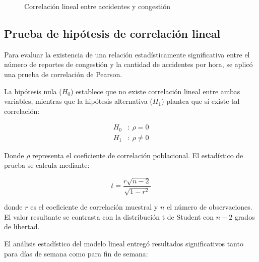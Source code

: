 \documentclass[12pt]{article}
\begin{document}
\begin{figure}[H]
    \centering
    \newline
    \newline
    \caption{Correlación lineal entre accidentes y congestión}
    \label{fig:corr_lineal}
\end{figure}

\subsection{Prueba de hipótesis de correlación lineal}

Para evaluar la existencia de una relación estadísticamente significativa entre el número de reportes de congestión y la cantidad de accidentes por hora, se aplicó una prueba de correlación de Pearson.

La hipótesis nula ($H_0$) establece que no existe correlación lineal entre ambas variables, mientras que la hipótesis alternativa ($H_1$) plantea que sí existe tal correlación:

\begin{align}
H_0&:\ \rho = 0 \\
H_1&:\ \rho \ne 0
\end{align}

Donde $\rho$ representa el coeficiente de correlación poblacional. El estadístico de prueba se calcula mediante:

\begin{equation}
t = \frac{r \sqrt{n - 2}}{\sqrt{1 - r^2}}
\end{equation}

donde $r$ es el coeficiente de correlación muestral y $n$ el número de observaciones. El valor resultante se contrasta con la distribución t de Student con $n - 2$ grados de libertad.

El análisis estadístico del modelo lineal entregó resultados significativos tanto para días de semana como para fin de semana:
\end{document}
